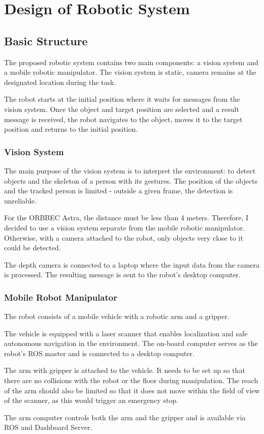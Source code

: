 \chapter{Design of Robotic System}

\section{Basic Structure}

The proposed robotic system contains two main components: a vision system and a mobile robotic manipulator.
The vision system is static, camera remains at the designated location during the task.\par
The robot starts at the initial position where it waits for messages from the vision system. Once the object and target position are selected and a result message is received, the robot navigates to the object, moves it to the target position and returns to the initial position.\par

\subsection{Vision System}

The main purpose of the vision system is to interpret the environment: to detect objects and the skeleton of a person with its gestures. The position of the objects and the tracked person is limited - outside a given frame, the detection is unreliable.\par
For the ORBBEC Astra, the distance must be less than 4 meters. Therefore, I decided to use a vision system separate from the mobile robotic manipulator. Otherwise, with a camera attached to the robot, only objects very close to it could be detected.\par
The depth camera is connected to a laptop where the input data from the camera is processed. The resulting message is sent to the robot's desktop computer.\par

\subsection{Mobile Robot Manipulator}
The robot consists of a mobile vehicle with a robotic arm and a gripper.\par
The vehicle is equipped with a laser scanner that enables localization and safe autonomous navigation in the environment. The on-board computer serves as the robot's ROS master and is connected to a desktop computer.\par
The arm with gripper is attached to the vehicle. It needs to be set up so that there are no collisions with the robot or the floor during manipulation. The reach of the arm should also be limited so that it does not move within the field of view of the scanner, as this would trigger an emergency stop.\par
The arm computer controls both the arm and the gripper and is available via ROS and Dashboard Server.\par



